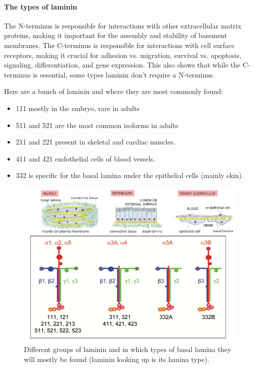 \documentclass[../main.tex]{subfiles}
\begin{document}
\paragraph{The types of laminin}

The N-terminus is responsible for interactions with other extracellular matrix proteins, making it important for the assembly and stability of basement membranes. The C-terminus is responsible for interactions with cell surface receptors, making it crucial for adhesion vs. migration, survival vs. apoptosis, signaling, differentiation, and gene expression. This also shows that while the C-terminus is essential, some types laminin don't require a N-terminus.

Here are a bunch of laminin and where they are most commonly found:
\begin{itemize}
	\item 111 mostly in the embryo, rare in adults
	\item 511 and 521 are the most common isoforms in adults
	\item 211 and 221 present in skeletal and cardiac muscles.
	\item 411 and 421 endothelial cells of blood vessels.
	\item 332 is specific for the basal lamina under the epithelial cells (mainly skin).
\end{itemize}

\begin{figure}[H]
	\centering
	\includegraphics[width=0.6\linewidth]{bl_type}
	\caption{Different groups of laminin and in which types of basal lamina they will mostly be found (laminin looking up is its lamina type).}
	\label{fig:bltype}
\end{figure}
\end{document}

